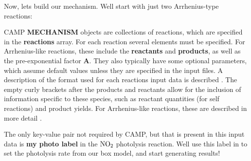 Now, let\textquotesingle{}s build our mechanism. We\textquotesingle{}ll start with just two Arrhenius-\/type reactions\+: 
\begin{DoxyCode}{0}
\DoxyCodeLine{\{}
\DoxyCodeLine{\ \ \ :\ ,}
\DoxyCodeLine{\ \ \ :\ ,}
\DoxyCodeLine{\ \ \ :\ [}
\DoxyCodeLine{\ \ \ \ \{}
\DoxyCodeLine{\ \ \ \ \ \ \ :\ ,}
\DoxyCodeLine{\ \ \ \ \ \ \ :\ \{}
\DoxyCodeLine{\ \ \ \ \ \ \ \ \ :\ \{\ \},}
\DoxyCodeLine{\ \ \ \ \ \ \ \ \ :\ \{\ \}}
\DoxyCodeLine{\ \ \ \ \ \ \},}
\DoxyCodeLine{\ \ \ \ \ \ \ :\ \{}
\DoxyCodeLine{\ \ \ \ \ \ \ \ \ :\ \{\ \},}
\DoxyCodeLine{\ \ \ \ \ \ \ \ \ :\ \{\ \}}
\DoxyCodeLine{\ \ \ \ \ \ \},}
\DoxyCodeLine{\ \ \ \ \},}
\DoxyCodeLine{\ \ \ \ \{}
\DoxyCodeLine{\ \ \ \ \ \ \ :\ ,}
\DoxyCodeLine{\ \ \ \ \ \ \ :\ \{}
\DoxyCodeLine{\ \ \ \ \ \ \ \ \ :\ \{\ \}}
\DoxyCodeLine{\ \ \ \ \ \ \},}
\DoxyCodeLine{\ \ \ \ \ \ :\ \{}
\DoxyCodeLine{\ \ \ \ \ \ \ \ :\ \{\ \},}
\DoxyCodeLine{\ \ \ \ \ \ \ \ :\ \{\ \}}
\DoxyCodeLine{\ \ \ \ \ \},}
\DoxyCodeLine{\ \ \ \ \ \ :\ }
\DoxyCodeLine{\ \ \ \ \},}
\DoxyCodeLine{\ \ \ \ \{}
\DoxyCodeLine{\ \ \ \ \ \ \ :\ ,}
\DoxyCodeLine{\ \ \ \ \ \ \ :\ \{}
\DoxyCodeLine{\ \ \ \ \ \ \ \ \ :\ \{\ \},}
\DoxyCodeLine{\ \ \ \ \ \ \ \ \ :\ \{\ \}}
\DoxyCodeLine{\ \ \ \ \ \ \},}
\DoxyCodeLine{\ \ \ \ \ \ \ :\ \{}
\DoxyCodeLine{\ \ \ \ \ \ \ \ \ :\ \{\ \}}
\DoxyCodeLine{\ \ \ \ \ \ \},}
\DoxyCodeLine{\ \ \ \ \}}
\DoxyCodeLine{\ \ ]}
\DoxyCodeLine{\}}

\end{DoxyCode}
 CAMP {\bfseries{MECHANISM}} objects are collections of reactions, which are specified in the {\bfseries{reactions}} array. For each reaction several elements must be specified. For Arrhenius-\/like reactions, these include the {\bfseries{reactants}} and {\bfseries{products}}, as well as the pre-\/exponential factor {\bfseries{A}}. They also typically have some optional parameters, which assume default values unless they are specified in the input files. A description of the format used for each reaction\textquotesingle{}s input data is described . The empty curly brackets after the products and reactants allow for the inclusion of information specific to these species, such as reactant quantities (for self reactions) and product yields. For Arrhenius-\/like reactions, these are described in more detail .

The only key-\/value pair not required by CAMP, but that is present in this input data is {\bfseries{my photo label}} in the $\ce{NO2}$ photolysis reaction. We\textquotesingle{}ll use this label in  to set the photolysis rate from our box model, and start generating results!

